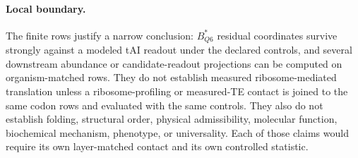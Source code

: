 \paragraph{Local boundary.}
The finite rows justify a narrow conclusion: $B^*_{Q6}$ residual coordinates survive strongly against a modeled tAI readout under the declared controls, and several downstream abundance or candidate-readout projections can be computed on organism-matched rows.  They do not establish measured ribosome-mediated translation unless a ribosome-profiling or measured-TE contact is joined to the same codon rows and evaluated with the same controls.  They also do not establish folding, structural order, physical admissibility, molecular function, biochemical mechanism, phenotype, or universality.  Each of those claims would require its own layer-matched contact and its own controlled statistic.

